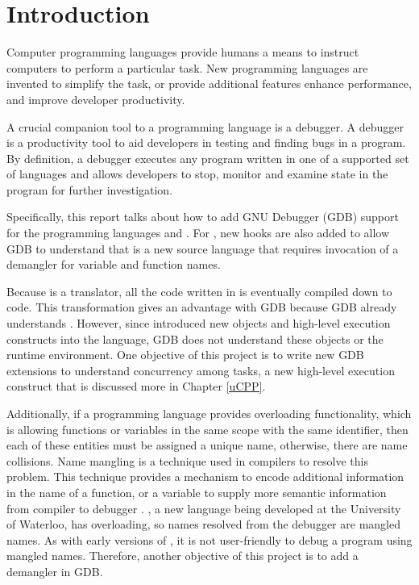 \chapter{Introduction} \label{introduction}
Computer programming languages provide humans a means to instruct computers to
perform a particular task. New programming languages are
invented to simplify the task, or provide additional features enhance
performance, and improve developer productivity.

A crucial companion tool to a programming language is a debugger. A debugger is a productivity tool to aid developers in testing
and finding bugs in a program. By definition, a debugger executes
any program written in one of a supported set of languages and allows developers
to stop, monitor and examine state in the program for further investigation.

Specifically, this report talks about how to add GNU Debugger (GDB) support for the
programming languages \uCPPS and \CFA.
For \CFA, new hooks are also added to allow GDB to understand that
\CFAS is a new source language that requires invocation of a demangler for
variable and function names.

Because \uCPPS is a translator, all the code written in \uCPPS is eventually
compiled down to \CCS code. This transformation gives \uCPPS an advantage with
GDB because GDB already understands \CC. However, since \uCPPS introduced new objects
and high-level execution constructs into the language, GDB does not understand
these objects or the runtime environment. One objective of this
project is to write new GDB extensions to understand concurrency among tasks, a new high-level execution construct that is discussed more in Chapter \ref{uCPP}.

Additionally, if a programming language provides overloading functionality,
which is allowing functions or variables in the same scope with the
same identifier, then each of these entities must be assigned a unique name, otherwise,
there are name collisions.
Name mangling is a technique used in compilers to resolve this
problem. This technique provides a mechanism to encode additional information in the
name of a function, or a variable to supply more semantic information from
compiler to debugger \cite{reference9}. \CFA, a new language being developed at the University of
Waterloo, has overloading, so names resolved from
the debugger are mangled names. As with early versions of \CC, it is not user-friendly to debug a program using
mangled names. Therefore, another objective of this project is to add a \CFAS demangler in GDB.
